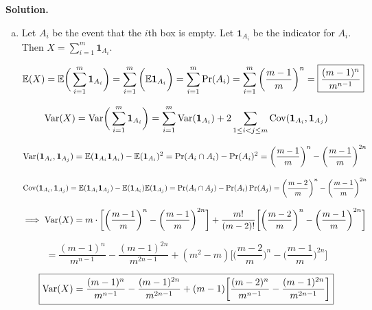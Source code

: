 \textbf{Solution.} \begin{enumerate}[(a)]

\item Let \(A_i\) be the event that the \(i\)th box is empty. Let \(\boldsymbol{1}_{A_i}\) be the indicator for \(A_i\). Then \(X = \sum_{i=1}^m \boldsymbol{1}_{A_i}\). 


\[
\mathbb{E}(X) = \mathbb{E} \bigg(\sum_{i=1}^m \boldsymbol{1}_{A_i} \bigg) = \sum_{i=1}^m \bigg( \mathbb{E} \boldsymbol{1}_{A_i} \bigg)  =  \sum_{i=1}^m \Pr(A_i) = \sum_{i=1}^m \bigg( \frac{m-1}{m} \bigg)^n = \boxed{ \frac{(m-1)^n}{m^{n-1}}} 
\]

\[
\mathrm{Var}(X) = \mathrm{Var} \bigg(\sum_{i=1}^m \boldsymbol{1}_{A_i} \bigg) =\sum_{i=1}^m \mathrm{Var}( \boldsymbol{1}_{A_i})  +2\sum_{1 \leq i < j \leq m} \mathrm{Cov}(\boldsymbol{1}_{A_i}, \boldsymbol{1}_{A_j})
\]

\[
\mathrm{Var}(\boldsymbol{1}_{A_i}, \boldsymbol{1}_{A_j}) = \mathbb{E} (\boldsymbol{1}_{A_i} \boldsymbol{1}_{A_i}) - \mathbb{E} (\boldsymbol{1}_{A_i})^2  = \Pr(A_i \cap A_i) - \Pr(A_i)^2 = \bigg( \frac{m-1}{m} \bigg)^n - \bigg( \frac{m-1}{m} \bigg)^{2n} 
\]

\[
\mathrm{Cov}(\boldsymbol{1}_{A_i}, \boldsymbol{1}_{A_j}) = \mathbb{E} (\boldsymbol{1}_{A_i} \boldsymbol{1}_{A_j}) - \mathbb{E} (\boldsymbol{1}_{A_i}) \mathbb{E}( \boldsymbol{1}_{A_j}) = \Pr(A_i \cap A_j) - \Pr(A_i)\Pr(A_j) = \bigg( \frac{m-2}{m} \bigg)^n - \bigg( \frac{m-1}{m} \bigg)^{2n} 
\]

\[
\implies \mathrm{Var}(X) = m \cdot \bigg[  \bigg( \frac{m-1}{m} \bigg)^n - \bigg( \frac{m-1}{m} \bigg)^{2n}  \bigg] + \frac{m!}{(m-2)!} \bigg[\bigg( \frac{m-2}{m} \bigg)^n - \bigg( \frac{m-1}{m} \bigg)^{2n}  \bigg]
\]

\[
= \frac{(m-1)^n}{m^{n-1}} -  \frac{(m-1)^{2n}}{m^{2n-1}} +  (m^2 -m )\bigg[\bigg( \frac{m-2}{m} \bigg)^n - \bigg( \frac{m-1}{m} \bigg)^{2n}  \bigg]
\]

\[
\boxed{
\mathrm{Var}(X) = \frac{(m-1)^n}{m^{n-1}} -  \frac{(m-1)^{2n}}{m^{2n-1}} +  (m - 1)\bigg[ \frac{(m-2)^n}{m^{n-1}}  -  \frac{(m-1)^{2n}}{m^{2n-1}}  \bigg]}
\]




%



\end{enumerate}
